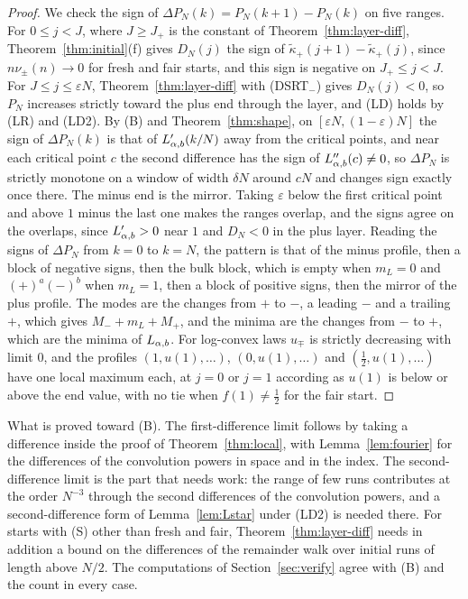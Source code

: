 \begin{proof}
We check the sign of $\Delta P_N(k)=P_N(k+1)-P_N(k)$ on five ranges. For $0\le j<J$, where $J\ge J_\plus$ is the constant of
Theorem~\ref{thm:layer-diff}, Theorem~\ref{thm:initial}(f) gives $D_N(j)$ the sign of
$\widetilde\kappa_\plus(j+1)-\widetilde\kappa_\plus(j)$, since $n\nu_\pm(n)\to0$ for fresh and fair starts,
and this sign is negative on $J_\plus\le j<J$. For $J\le j\le\varepsilon N$, Theorem~\ref{thm:layer-diff}
with (DSRT$_\minus$) gives $D_N(j)<0$, so $P_N$ increases strictly toward the plus end through the
layer, and (LD) holds by (LR) and (LD2). By (B) and Theorem~\ref{thm:shape}, on $[\varepsilon N,(1-\varepsilon)N]$ the sign
of $\Delta P_N(k)$ is that of $L_{\alpha,b}'(k/N)$ away from the critical points, and near each critical
point $c$ the second difference has the sign of $L_{\alpha,b}''(c)\ne0$, so $\Delta P_N$ is strictly
monotone on a window of width $\delta N$ around $cN$ and changes sign exactly once there.
The minus end is the mirror. Taking $\varepsilon$ below the first critical point and above $1$
minus the last one makes the ranges overlap, and the signs agree on the overlaps, since
$L_{\alpha,b}'>0$ near $1$ and $D_N<0$ in the plus layer. Reading the signs of $\Delta P_N$ from $k=0$
to $k=N$, the pattern is that of the minus profile, then a block of negative signs, then the
bulk block, which is empty when $m_L=0$ and $(+)^{a}(-)^{b}$ when $m_L=1$, then a block of
positive signs, then the mirror of the plus profile. The modes are the changes from $+$ to
$-$, a leading $-$ and a trailing $+$, which gives $M_\minus+m_L+M_\plus$, and the minima are
the changes from $-$ to $+$, which are the minima of $L_{\alpha,b}$. For log-convex laws $u_\mp$ is
strictly decreasing with limit $0$, and the profiles $(1,u(1),\dots)$, $(0,u(1),\dots)$ and
$(\frac12,u(1),\dots)$ have one local maximum each, at $j=0$ or $j=1$ according as $u(1)$ is
below or above the end value, with no tie when $f(1)\ne\frac12$ for the fair start.
\end{proof}

What is proved toward (B). The first-difference limit follows by taking a difference inside
the proof of Theorem~\ref{thm:local}, with Lemma~\ref{lem:fourier} for the differences of the
convolution powers in space and in the index. The second-difference limit is the part that
needs work: the range of few runs contributes at the order $N^{-3}$ through the second
differences of the convolution powers, and a second-difference form of Lemma~\ref{lem:Lstar} under
(LD2) is needed there. For starts with (S) other than fresh and fair, Theorem~\ref{thm:layer-diff}
needs in addition a bound on the differences of the remainder walk over initial runs of length
above $N/2$. The computations of Section~\ref{sec:verify} agree with (B) and the count in every
case.

